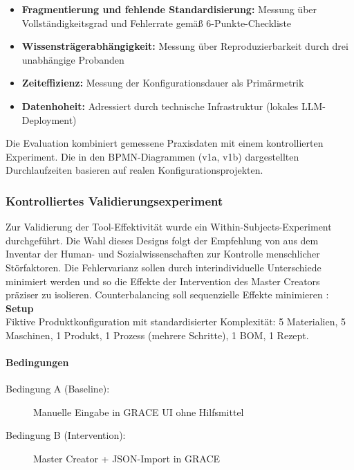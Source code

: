 \begin{itemize}
    \item \textbf{Fragmentierung und fehlende Standardisierung:} Messung über Vollständigkeitsgrad und Fehlerrate gemäß 6-Punkte-Checkliste
    \item \textbf{Wissensträgerabhängigkeit:} Messung über Reproduzierbarkeit durch drei unabhängige Probanden
    \item \textbf{Zeiteffizienz:} Messung der Konfigurationsdauer als Primärmetrik
    \item \textbf{Datenhoheit:} Adressiert durch technische Infrastruktur (lokales LLM-Deployment)
\end{itemize}

\noindent Die Evaluation kombiniert gemessene Praxisdaten mit einem kontrollierten Experiment. Die in den BPMN-Diagrammen (v1a, v1b) dargestellten Durchlaufzeiten basieren auf realen Konfigurationsprojekten.

\subsubsection{Kontrolliertes Validierungsexperiment}
\label{subsubsec:Experiment}

Zur Validierung der Tool-Effektivität wurde ein Within-Subjects-Experiment durchgeführt. Die Wahl dieses Designs folgt der Empfehlung von \cite{Doering2023} aus dem Inventar der Human- und Sozialwissenschaften zur Kontrolle menschlicher Störfaktoren. Die Fehlervarianz sollen durch interindividuelle Unterschiede minimiert werden und so die Effekte der Intervention des Master Creators präziser zu isolieren. Counterbalancing soll sequenzielle Effekte minimieren \citep{Doering2023}:\\

\noindent \textbf{Setup}
\\ 
Fiktive Produktkonfiguration mit standardisierter Komplexität: 5 Materialien, 5 Maschinen, 1 Produkt, 1 Prozess (mehrere Schritte), 1 BOM, 1 Rezept.

\paragraph{Bedingungen}
\begin{description}
    \item[Bedingung A (Baseline):] Manuelle Eingabe in GRACE UI ohne Hilfsmittel
    \item[Bedingung B (Intervention):] Master Creator + JSON-Import in GRACE
\end{description}

